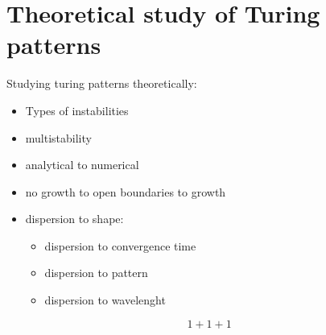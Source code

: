 \chapter{Theoretical study of Turing patterns }
Studying turing patterns theoretically:
\begin{itemize}
\item Types of instabilities
\item multistability
\item analytical to numerical
\item no growth to open boundaries to growth
\item dispersion to shape:
    \begin{itemize}

    \item dispersion to convergence time
    \item dispersion to pattern
    \item dispersion to wavelenght
     \end{itemize}

\end{itemize}

\[1+1+1\]
